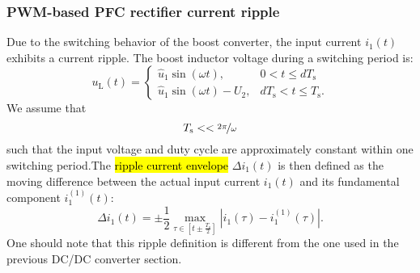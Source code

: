 \begin{frame}
    \frametitle{PWM-based PFC rectifier current ripple} 
    Due to the switching behavior of the boost converter, the input current $i_1(t)$ exhibits a current ripple. The boost inductor voltage during a switching period is:
    \begin{equation}
        u_\mathrm{L}(t) = \begin{cases} \hat{u}_1 \sin(\omega t), & 0 < t \leq d T_\mathrm{s}\\
        \hat{u}_1 \sin(\omega t) - U_2, & d T_\mathrm{s} < t \leq T_\mathrm{s}. 
        \end{cases}
    \end{equation}\pause 
    We assume that $$ T_\mathrm{s} << \nicefrac{2\pi}{\omega}$$ such that the input voltage and duty cycle are approximately constant within one switching period.\pause The \hl{ripple  current envelope} $\Delta i_1(t)$ is then defined as the moving difference between the actual input current $i_1(t)$ and its fundamental component $i^{(1)}_1(t)$: 
    \begin{equation}
            \Delta i_1(t) = \pm \frac{1}{2} \max_{\tau\in[t \pm \frac{T_\mathrm{s}}{2}]}|i_1(\tau) - i^{(1)}_1(\tau)|.
    \end{equation}\pause
    One should note that this ripple definition is different from the one used in the previous DC/DC converter section.
\end{frame}

